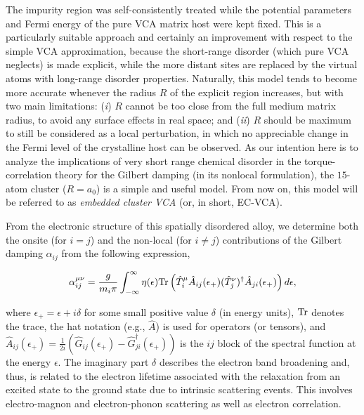 The impurity region was self-consistently treated while the potential parameters and Fermi energy of the pure VCA matrix host were kept fixed. This is a particularly suitable approach and certainly an improvement with respect to the simple VCA approximation, because the short-range disorder (which pure VCA neglects) is made explicit, while the more distant sites are replaced by the virtual atoms with long-range disorder properties. Naturally, this model tends to become more accurate whenever the radius $R$ of the explicit region increases, but with two main limitations: (\textit{i}) $R$ cannot be too close from the full medium matrix radius, to avoid any surface effects in real space; and (\textit{ii}) $R$ should be maximum to still be considered as a local perturbation, in which no appreciable change in the Fermi level of the crystalline host can be observed. As our intention here is to analyze the implications of very short range chemical disorder in the torque-correlation theory for the Gilbert damping (in its nonlocal formulation), the $15$-atom cluster ($R=a_0$) is a simple and useful model. From now on, this model will be referred to as \textit{embedded cluster VCA} (or, in short, EC-VCA).

From the electronic structure of this spatially disordered alloy, we determine both the onsite (for $i=j$) and the non-local (for $i\neq j$) contributions of the Gilbert damping $\alpha_{ij}$ from the following expression,

\begin{equation}\label{eq:damping-dft}
\begin{split}
\alpha_{ij}^{\mu\nu}=\frac{g}{m_i \pi}\int_{-\infty}^{\infty}\eta(\epsilon)\textnormal{Tr}\left(\hat{T}_{i}^{\mu}\hat{A}_{ij}(\epsilon_{+})(\hat{T}_{j}^{\nu})^{\dagger}\hat{A}_{ji}(\epsilon_{+})\right)d\epsilon,
\end{split}
\end{equation}

\noindent where $\epsilon_{+}=\epsilon+i\delta$ for some small positive value $\delta$ (in energy units), $\textnormal{Tr}$ denotes the trace, the hat notation (e.g., $\hat{A}$) is used for operators (or tensors), and $\hat{A}_{ij}(\epsilon_{+})=\frac{1}{2i}(\hat{G}_{ij}(\epsilon_{+})-\hat{G}_{ji}^{\dagger}(\epsilon_{+}))$ is the $ij$ block of the spectral function at the energy $\epsilon$. The imaginary part $\delta$ describes the electron band broadening and, thus, is related to the electron lifetime associated with the relaxation from an excited state to the ground state due to intrinsic scattering events. This involves electro-magnon and electron-phonon scattering as well as electron correlation. 

